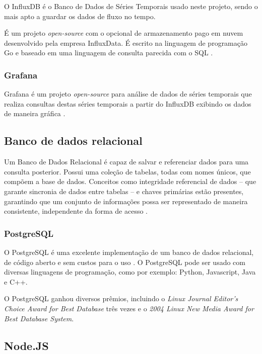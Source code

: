 O InfluxDB é o Banco de Dados de Séries Temporais usado neste projeto, sendo o mais apto a guardar os dados de fluxo no tempo. \cite{Lundrigan2017}

É um projeto \textit{open-source} com o opcional de armazenamento pago em nuvem desenvolvido pela empresa InfluxData. É escrito na linguagem de programação Go e baseado em uma linguagem de consulta parecida com o SQL \cite{Noor2017}.

\subsubsection{Grafana}

Grafana é um projeto \textit{open-source} para análise de dados de séries temporais  \cite{Noor2017} que realiza consultas destas séries temporais a partir do InfluxDB exibindo os dados de maneira gráfica \cite{chang2017kubernetes}.

\subsection{Banco de dados relacional}

Um Banco de Dados Relacional é capaz de salvar e referenciar dados para uma consulta posterior. Possui uma coleção de tabelas, todas com nomes únicos, que compõem a base de
dados. Conceitos como integridade referencial de dados – que garante sincronia de dados entre tabelas – e chaves primárias estão presentes, garantindo que um conjunto de informações possa ser representado de maneira consistente, independente da forma de acesso  \cite{bancosrelacionais}.

\subsubsection{PostgreSQL}

O PostgreSQL é uma excelente implementação de um banco de dados relacional, de código aberto e sem custos para o uso  \cite{stones2006beginning}. O 
PostgreSQL pode ser usado com diversas linguagens de programação, como por exemplo: Python, Javascript, Java e C++.

O PostgreSQL ganhou diversos prêmios, incluindo o \textit{Linux Journal Editor's Choice Award for Best Database} três vezes e o \textit{2004 Linux New Media Award for Best Database System}.

\subsection{Node.JS}

